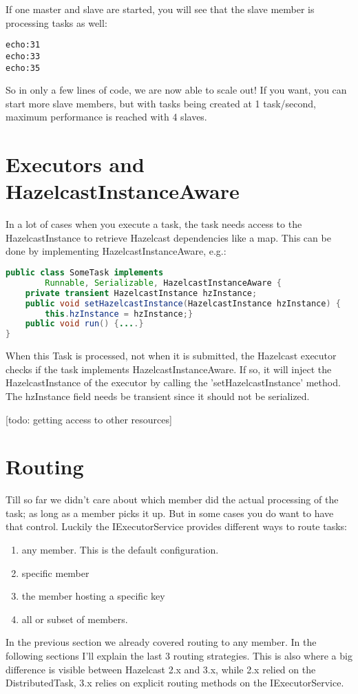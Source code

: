 If one master and slave are started, you will see that the slave member is processing tasks as well:
\begin{lstlisting}
echo:31
echo:33
echo:35	
\end{lstlisting}
So in only a few lines of code, we are now able to scale out! If you want, you can start more slave members, but with tasks being created at 1 task/second, maximum performance is reached with 4 slaves.

\section{Executors and HazelcastInstanceAware}
In a lot of cases when you execute a task, the task needs access to the HazelcastInstance to retrieve Hazelcast dependencies like a map. This can be done by implementing HazelcastInstanceAware, e.g.:
\begin{lstlisting}[language=java]
public class SomeTask implements
        Runnable, Serializable, HazelcastInstanceAware {
    private transient HazelcastInstance hzInstance;
    public void setHazelcastInstance(HazelcastInstance hzInstance) {
        this.hzInstance = hzInstance;}
    public void run() {....}
}
\end{lstlisting}
When this Task is processed, not when it is submitted, the Hazelcast executor checks if the task implements HazelcastInstanceAware. If so, it will inject the HazelcastInstance of the executor by calling the 'setHazelcastInstance' method. The hzInstance field needs be transient since it should not be serialized.

[todo: getting access to other resources]

\section{Routing}
Till so far we didn't care about which member did the actual processing of the task; as long as a member picks it up. But in some cases you do want to have that control. Luckily the IExecutorService provides different ways to route tasks:
\begin{enumerate}
\item any member. This is the default configuration.
\item specific member
\item the member hosting a specific key
\item all or subset of members.
\end{enumerate}
In the previous section we already covered routing to any member. In the following sections I'll explain the last 3 routing strategies. This is also where a big difference is visible between Hazelcast 2.x and 3.x, while 2.x relied on the DistributedTask, 3.x relies on explicit routing methods on the IExecutorService. 

